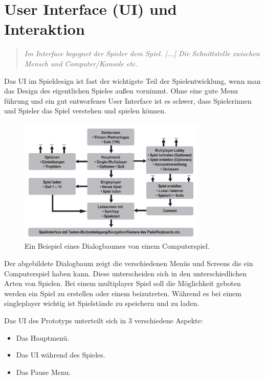 \chapter{User Interface (UI) und Interaktion}

\begin{quote}
\emph{\glqq Im Interface begegnet der Spieler dem Spiel. [...] Die Schnittstelle zwischen Mensch und Computer/Konsole etc.\grqq}~\cite[p.~161]{GameDesign} \\
\end{quote}

Das UI im Spieldesign ist fast der wichtigste Teil der Spielentwicklung, wenn man das Design des eigentlichen Spieles außen vornimmt. 
Ohne eine gute Menu führung und ein gut entworfenes User Interface ist es schwer, dass Spielerinnen und Spieler das Spiel verstehen und spielen können. 

\begin{figure}[H]
    \centering
    \includegraphics[width=0.8\textwidth]{chapters/03/images/Spielinterface.png}
    \caption{Ein Beispiel eines Dialogbaumes von einem Computerspiel.}
    \label{htl01}
\end{figure}

Der abgebildete Dialogbaum zeigt die verschiedenen Menüs und Screens die ein Computerspiel haben kann.
Diese unterscheiden sich in den unterschiedlichen Arten von Spielen. 
Bei einem \gls{multiplayer} Spiel soll die Möglichkeit geboten werden ein Spiel zu erstellen oder einem beizutreten. 
Während es bei einem \gls{singleplayer} wichtig ist Spielstände zu speichern und zu laden.

\pagebreak

Das \gls{UI} des Prototyps unterteilt sich in 3 verschiedene Aspekte:

\begin{itemize}
    \item Das Hauptmenü.
    \item Das \gls{UI} während des Spieles.
    \item Das Pause Menu.
\end{itemize}

